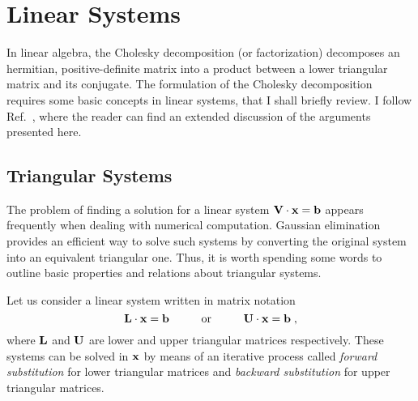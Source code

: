 \chapter{Linear Systems}
\label{app:lin_sys}

In linear algebra, the Cholesky decomposition (or factorization) decomposes an hermitian, positive-definite matrix into a product between a lower triangular matrix and its conjugate. The formulation of the Cholesky decomposition requires some basic concepts in linear systems, that I shall briefly review. I follow Ref.~\cite{GoluVanl96}, where the reader can find an extended discussion of the arguments presented here.

\section{Triangular Systems}
The problem of finding a solution for a linear system $\mathbf{V} \cdot \mathbf{x} = \mathbf{b}$ appears frequently when dealing with numerical computation. Gaussian elimination provides an efficient way to solve such systems by converting the  original system into an equivalent triangular one. Thus, it is worth spending some words to outline basic properties and relations about triangular systems.%

Let us consider a linear system written in matrix notation
\begin{equation}
    \mb{L} \cdot \mb{x} = \mb{b} \hspace{10mm} \textrm{or} \hspace{10mm} \mb{U} \cdot \mb{x} = \mb{b} \; ,
\end{equation}
where $\mathbf{L}$ and $\mathbf{U}$ are lower and upper triangular matrices respectively. These systems can be solved in $\mathbf{x}$ by means of an iterative process called \textit{forward substitution} for lower triangular matrices and \textit{backward substitution} for upper triangular matrices. 


